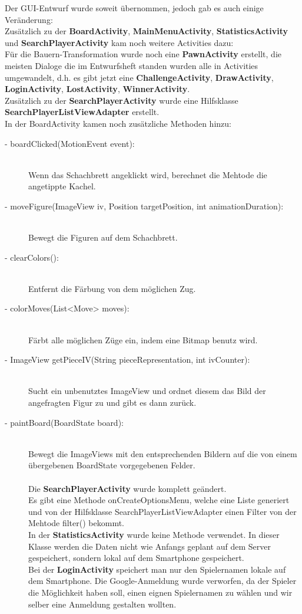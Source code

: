 \documentclass[parskip=full]{scrartcl}
\begin{document}
		Der GUI-Entwurf wurde soweit übernommen, jedoch gab es auch einige Veränderung: \\
		Zusätzlich zu der \textbf{BoardActivity}, \textbf{MainMenuActivity}, \textbf{StatisticsActivity} und \textbf{SearchPlayerActivity} kam noch weitere Activities dazu: \\
Für die Bauern-Transformation wurde noch eine \textbf{PawnActivity} erstellt, die meisten Dialoge die im Entwurfsheft standen wurden alle in Activities umgewandelt, d.h. es gibt jetzt eine \textbf{ChallengeActivity}, \textbf{DrawActivity}, \textbf{LoginActivity}, \textbf{LostActivity}, \textbf{WinnerActivity}. \\ Zusätzlich zu der \textbf{SearchPlayerActivity} wurde eine Hilfsklasse \textbf{SearchPlayerListViewAdapter} erstellt.\\
In der BoardActivity kamen noch zusätzliche Methoden hinzu: 
\begin{description}
\item[- boardClicked(MotionEvent event):]\hfill \\ Wenn das Schachbrett angeklickt wird, berechnet die Mehtode die angetippte Kachel.
\item[- moveFigure(ImageView iv, Position targetPosition, int animationDuration):]\hfill \\  Bewegt die Figuren auf dem Schachbrett.\\
\item[- clearColors():]\hfill \\ Entfernt die Färbung von dem möglichen Zug.
\item[- colorMoves(List<Move> moves):]\hfill \\ Färbt alle möglichen Züge ein, indem eine Bitmap benutz wird.
\item[- ImageView getPieceIV(String pieceRepresentation, int ivCounter):]\hfill \\ Sucht ein unbenutztes ImageView und ordnet diesem das Bild der angefragten Figur zu und gibt es dann zurück.
\item[- paintBoard(BoardState board):]\hfill \\ Bewegt die ImageViews mit den entsprechenden Bildern auf die von einem übergebenen BoardState vorgegebenen Felder. \\ 
\\
Die \textbf{SearchPlayerActivity} wurde komplett geändert. \\
Es gibt eine Methode onCreateOptionsMenu, welche eine Liste generiert und von der Hilfsklasse SearchPlayerListViewAdapter einen Filter von der Mehtode filter() bekommt.\\
In der \textbf{StatisticsActivity} wurde keine Methode verwendet. In dieser Klasse werden die Daten nicht wie Anfangs geplant auf dem Server gespeichert, sondern lokal auf dem Smartphone gespeichert. \\
Bei der \textbf{LoginActivity} speichert man nur den Spielernamen lokale auf dem Smartphone. Die Google-Anmeldung wurde verworfen, da der Spieler die Möglichkeit haben soll, einen eignen Spielernamen zu wählen und wir  selber eine Anmeldung gestalten wollten.
\end{description}
\end{document}
